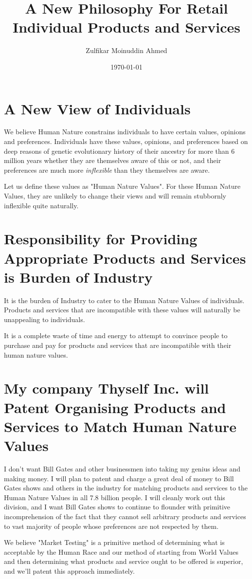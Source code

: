\documentclass{amsart}
\title{A New Philosophy For Retail Individual Products and Services}
\author{Zulfikar Moinuddin Ahmed}
\date{\today}
\begin{document}
\maketitle

\section{A New View of Individuals}

We believe Human Nature constrains individuals to have certain values, opinions and preferences.  Individuals have these values, opinions, and preferences based on deep reasons of genetic evolutionary history of their ancestry for more than 6 million years whether they are themselves aware of this or not, and their preferences are much more {\em inflexible} than they themselves are aware.

Let us define these values as "Human Nature Values".  For these Human Nature Values, they are unlikely to change their views and will remain stubbornly inflexible quite naturally.  

\section{Responsibility for Providing Appropriate Products and Services is Burden of Industry}

It is the burden of Industry to cater to the Human Nature Values of individuals.  Products and services that are incompatible with these values will naturally be unappealing to individuals.

It is a complete waste of time and energy to attempt to convince people to purchase and pay for products and services that are incompatible with their human nature values.

\section{My company Thyself Inc. will Patent Organising Products and Services to Match Human Nature Values}

I don't want Bill Gates and other businessmen into taking my genius ideas and making money.  I will plan to patent and charge a great deal of money to Bill Gates shows and others in the industry for matching products and services to the Human Nature Values in all 7.8 billion people.  I will cleanly work out this division, and I want Bill Gates shows to continue to flounder with primitive incomprehension of the fact that they cannot sell arbitrary products and services to vast majority of people whose preferences are not respected by them.  

We believe "Market Testing" is a primitive method of determining what is acceptable by the Human Race and our method of starting from World Values and then determining what products and service ought to be offered is superior, and we'll patent this approach immediately.
\end{document}
